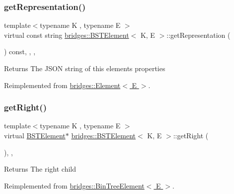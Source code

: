 \subsubsection{\texorpdfstring{get\+Representation()}{getRepresentation()}}
{\footnotesize\ttfamily template$<$typename K , typename E $>$ \\
virtual const string \hyperlink{classbridges_1_1_b_s_t_element}{bridges\+::\+B\+S\+T\+Element}$<$ K, E $>$\+::get\+Representation (\begin{DoxyParamCaption}{ }\end{DoxyParamCaption}) const\hspace{0.3cm}{\ttfamily [inline]}, {\ttfamily [override]}, {\ttfamily [protected]}, {\ttfamily [virtual]}}

\begin{DoxyReturn}{Returns}
The J\+S\+ON string of this element\textquotesingle{}s properties 
\end{DoxyReturn}


Reimplemented from \hyperlink{classbridges_1_1_element_aab9638d19b612b69db1b96d0dbf39482}{bridges\+::\+Element$<$ E $>$}.

\hypertarget{classbridges_1_1_b_s_t_element_a35e93bce32de933522dccde5f2b5ffd9}{}\label{classbridges_1_1_b_s_t_element_a35e93bce32de933522dccde5f2b5ffd9} 
\subsubsection{\texorpdfstring{get\+Right()}{getRight()}\hspace{0.1cm}{\footnotesize\ttfamily [1/2]}}
{\footnotesize\ttfamily template$<$typename K , typename E $>$ \\
virtual \hyperlink{classbridges_1_1_b_s_t_element}{B\+S\+T\+Element}$\ast$ \hyperlink{classbridges_1_1_b_s_t_element}{bridges\+::\+B\+S\+T\+Element}$<$ K, E $>$\+::get\+Right (\begin{DoxyParamCaption}{ }\end{DoxyParamCaption})\hspace{0.3cm}{\ttfamily [inline]}, {\ttfamily [override]}, {\ttfamily [virtual]}}

\begin{DoxyReturn}{Returns}
The right child 
\end{DoxyReturn}


Reimplemented from \hyperlink{classbridges_1_1_bin_tree_element_a5751f2fe38e2364f68dc37939fce060f}{bridges\+::\+Bin\+Tree\+Element$<$ E $>$}.



